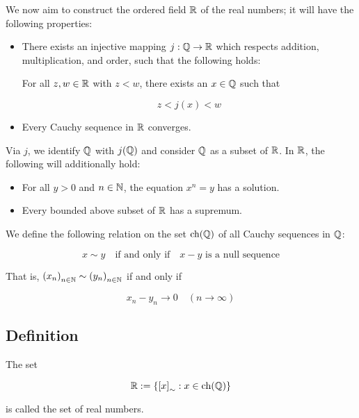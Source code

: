 We now aim to construct the ordered field \( \mathbb{R} \) of the real numbers;
it will have the following properties:

\begin{itemize}
	
	\item There exists an injective mapping \( j : \mathbb{Q} \to \mathbb{R} \) which respects addition, 
    	  multiplication, and order, such that the following holds:
		
		For all \( z, w \in \mathbb{R} \) with \( z < w \), there exists an \( x \in \mathbb{Q} \) such that
		
		\[
			z < j(x) < w
		\]

	\item Every Cauchy sequence in \( \mathbb{R} \) converges.

\end{itemize}

Via \( j \), we identify \( \mathbb{Q} \) with \( j(\mathbb{Q}) \) and consider \( \mathbb{Q} \) as a 
subset of \( \mathbb{R} \). In \( \mathbb{R} \), the following will additionally hold:

\begin{itemize}

	\item For all \( y > 0 \) and \( n \in \mathbb{N} \), the equation \( x^n = y \) has a solution.

	\item Every bounded above subset of \( \mathbb{R} \) has a supremum.

\end{itemize}

We define the following relation on the set \( \operatorname{ch}(\mathbb{Q}) \) of all Cauchy sequences 
in \( \mathbb{Q} \):

\[
	x \sim y \quad \text{if and only if} \quad x - y \text{ is a null sequence}
\]

That is, \( {(x_n)}_{n \in \mathbb{N}} \sim {(y_n)}_{n \in \mathbb{N}} \) if and only if

\[
	x_n - y_n \to 0 \quad (n \to \infty)
\]

\subsection{Definition}

The set

\[
	\mathbb{R} := \{ {[x]}_{\sim} : x \in \operatorname{ch}(\mathbb{Q}) \}
\]

is called the set of real numbers.

